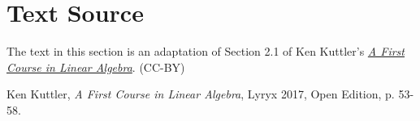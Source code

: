 \documentclass{ximera}
\begin{document}


\section*{Text Source}
The text in this section is an adaptation of Section 2.1 of Ken Kuttler's \href{https://open.umn.edu/opentextbooks/textbooks/a-first-course-in-linear-algebra-2017}{\it A First Course in Linear Algebra}. (CC-BY)

Ken Kuttler, {\it  A First Course in Linear Algebra}, Lyryx 2017, Open Edition, p. 53-58.
\end{document}
